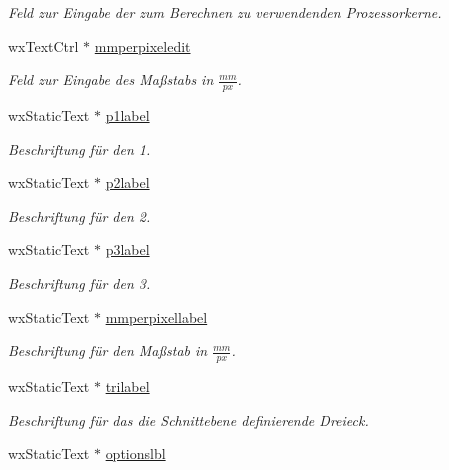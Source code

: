 \begin{DoxyCompactItemize}
\begin{DoxyCompactList}\small\item\em Feld zur Eingabe der zum Berechnen zu verwendenden Prozessorkerne. \end{DoxyCompactList}\item 
wx\-Text\-Ctrl $\ast$ \hyperlink{classGUICutRenderWindow_a76ced7f0bb7a2b08142aaf225f37c108}{mmperpixeledit}
\begin{DoxyCompactList}\small\item\em Feld zur Eingabe des Maßstabs in $\frac{mm}{px}$. \end{DoxyCompactList}\item 
wx\-Static\-Text $\ast$ \hyperlink{classGUICutRenderWindow_ac28961397f75c1d67dd1d983cda586f8}{p1label}
\begin{DoxyCompactList}\small\item\em Beschriftung für den 1. \end{DoxyCompactList}\item 
wx\-Static\-Text $\ast$ \hyperlink{classGUICutRenderWindow_adc1202b42f220ea7b8a8830f4d9d322a}{p2label}
\begin{DoxyCompactList}\small\item\em Beschriftung für den 2. \end{DoxyCompactList}\item 
wx\-Static\-Text $\ast$ \hyperlink{classGUICutRenderWindow_a6d1f742f0a78f84882f543f0cbbd6357}{p3label}
\begin{DoxyCompactList}\small\item\em Beschriftung für den 3. \end{DoxyCompactList}\item 
wx\-Static\-Text $\ast$ \hyperlink{classGUICutRenderWindow_ab1f4863c699e72e54e8b3f6d320a5e3a}{mmperpixellabel}
\begin{DoxyCompactList}\small\item\em Beschriftung für den Maßstab in $\frac{mm}{px}$. \end{DoxyCompactList}\item 
wx\-Static\-Text $\ast$ \hyperlink{classGUICutRenderWindow_a1d6dae72dbc65725dee34799e7fb7af1}{trilabel}
\begin{DoxyCompactList}\small\item\em Beschriftung für das die Schnittebene definierende Dreieck. \end{DoxyCompactList}\item 
wx\-Static\-Text $\ast$ \hyperlink{classGUICutRenderWindow_a3317d0e8526d4a11168e86f673576ee3}{optionslbl}

\end{DoxyCompactItemize}
